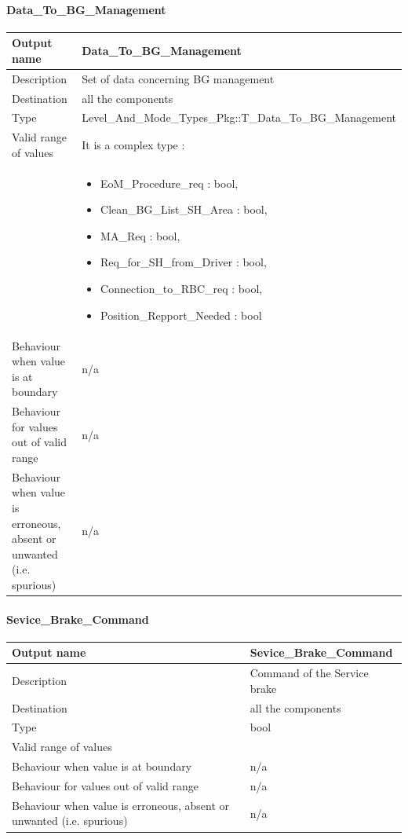 \paragraph{Data\_To\_BG\_Management}

\begin{longtable}{p{}p{}}
\toprule
Output name				& Data\_To\_BG\_Management \\
\midrule
Description				& Set of data concerning BG management \\
\midrule
Destination				& all the components  \\ 
\midrule
Type					& Level\_And\_Mode\_Types\_Pkg::T\_Data\_To\_BG\_Management \\
\midrule
Valid range of values	& It is a complex type : \\
& \begin{itemize}
\item EoM\_Procedure\_req : bool,
\item  Clean\_BG\_List\_SH\_Area : bool, 
\item MA\_Req : bool,
\item  Req\_for\_SH\_from\_Driver : bool,
\item Connection\_to\_RBC\_req : bool, 
\item Position\_Repport\_Needed : bool
\end{itemize} \\
\midrule
Behaviour when value is at boundary	& n/a \\ 
\midrule
Behaviour for values out of valid range	& n/a \\ 
\midrule
Behaviour when value is erroneous, absent or unwanted (i.e. spurious) & n/a \\
\bottomrule
\end{longtable}


\paragraph{Sevice\_Brake\_Command}

\begin{longtable}{p{}p{}}
\toprule
Output name				& Sevice\_Brake\_Command \\
\midrule
Description				& Command of the Service brake \\
\midrule
Destination				& all the components \\ 
\midrule
Type					& bool \\
\midrule
Valid range of values	&  \\
\midrule
Behaviour when value is at boundary	& n/a \\ 
\midrule
Behaviour for values out of valid range	& n/a \\ 
\midrule
Behaviour when value is erroneous, absent or unwanted (i.e. spurious) & n/a \\
\bottomrule
\end{longtable}

